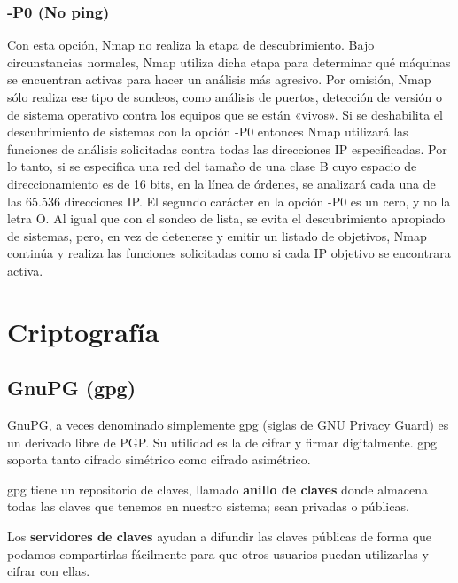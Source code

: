 \documentclass[a4paper, 11pt, titlepage]{book}
\begin{document}
            \subsubsection{-P0 (No ping)} Con esta opción, Nmap no realiza la etapa de descubrimiento. 
            Bajo circunstancias normales, Nmap utiliza dicha etapa para determinar qué máquinas se encuentran 
            activas para hacer un análisis más agresivo. Por omisión, Nmap sólo realiza ese tipo de sondeos, 
            como análisis de puertos, detección de versión o de sistema operativo contra los equipos que se 
            están «vivos». Si se deshabilita el descubrimiento de sistemas con la opción -P0 entonces Nmap 
            utilizará las funciones de análisis solicitadas contra todas las direcciones IP especificadas. 
            Por lo tanto, si se especifica una red del tamaño de una clase B cuyo espacio de direccionamiento 
            es de 16 bits, en la línea de órdenes, se analizará cada una de las 65.536 direcciones IP. El 
            segundo carácter en la opción -P0 es un cero, y no la letra O. Al igual que con el sondeo de lista, 
            se evita el descubrimiento apropiado de sistemas, pero, en vez de detenerse y emitir un listado de 
            objetivos, Nmap continúa y realiza las funciones solicitadas como si cada IP objetivo se encontrara 
            activa.

    \section{Criptografía}

        \subsection{GnuPG (gpg)}
    
            GnuPG, a veces denominado simplemente gpg (siglas de GNU Privacy Guard) es un derivado libre
            de PGP. Su utilidad es la de cifrar y firmar digitalmente. gpg soporta tanto cifrado simétrico 
            como cifrado asimétrico.
    
            gpg tiene un repositorio de claves, llamado \textbf{anillo de claves} 
            donde almacena todas las claves que tenemos en nuestro sistema; sean privadas o públicas.
    
            Los \textbf{servidores de claves} ayudan a difundir las claves públicas 
            de forma que podamos compartirlas fácilmente para que otros usuarios puedan utilizarlas y
            cifrar con ellas.
    
\end{document}
